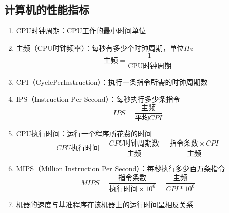 \documentclass[./computer-organization-and-architecture.tex]{subfiles}
\begin{document}
    \subsection{计算机的性能指标}

    \begin{enumerate}
        \item CPU时钟周期：CPU工作的最小时间单位
        \item 主频（CPU时钟频率）：每秒有多少个时钟周期，单位$Hz$
        \[
            \text{主频} = \dfrac{1}{\text{CPU时钟周期}}
        \]
        \item CPI（CyclePerInstruction）：执行一条指令所需的时钟周期数
        \item IPS（Instruction Per Second）：每秒执行多少条指令
        \[
            IPS = \dfrac{\text{主频}}{\text{平均}CPI}
        \]
        \item CPU执行时间：运行一个程序所花费的时间
        \[
            CPU\text{执行时间} = \dfrac{CPU\text{时钟周期数}}{\text{主频}} = \dfrac{\text{指令条数}\times CPI}{\text{主频}}
        \]
        \item MIPS（Million Instruction Per Second）：每秒执行多少百万条指令
        \[
            MIPS = \dfrac{\text{指令条数}}{\text{执行时间}\times 10^6} = \dfrac{\text{主频}}{CPI * 10^6}
        \]
        \item 机器的速度与基准程序在该机器上的运行时间呈相反关系
    \end{enumerate}
\end{document}
